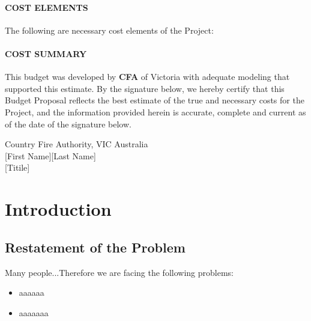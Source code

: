 \documentclass[13pt]{ctexart} %
\begin{document}
\paragraph{COST ELEMENTS\\ }

The following are necessary cost elements of the Project:


\paragraph{COST SUMMARY\\ }


\begin{flushleft}
    \fontsize{12pt}{10pt} %
\selectfont
\indent This budget was developed by \textbf{CFA} of Victoria with adequate modeling that supported this estimate. By the signature below,  we hereby certify that this Budget Proposal reflects the best estimate of the true and necessary costs for the Project, and the information provided herein is accurate, complete and current as of the date of the signature below.
\end{flushleft}

\thispagestyle{empty}
\begin{flushleft}
    Country Fire Authority, VIC Australia\\
    {[First Name][Last Name]}\\
    {[Titile]}
\end{flushleft}

\newpage
\thispagestyle{empty}
\tableofcontents
\newpage
\setcounter{page}{1}

\fancyhf{}
\fancyhead[C]{ }
\fancyfoot[C]{\bfseries\thepage}

\section{Introduction}
\subsection{Restatement of the Problem}
Many people...Therefore we are facing the following problems:
\begin{itemize}
    \item aaaaaa
    \item aaaaaaa
\end{itemize}
\end{document}
